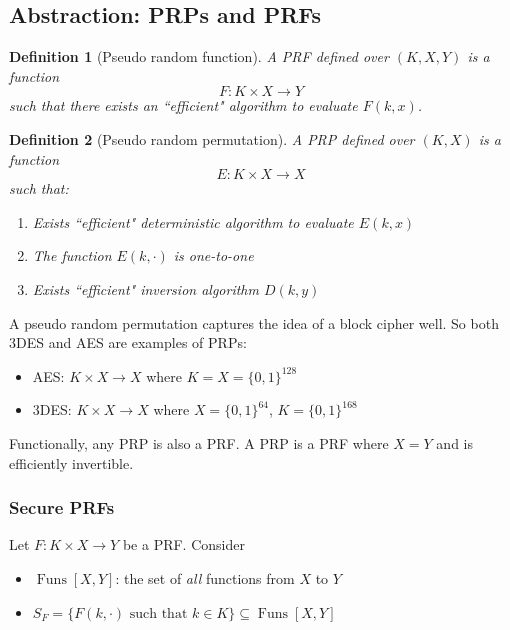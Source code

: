 \documentclass[10pt,a4paper]{report}
\newtheorem{definition}{Definition}[section]
\begin{document}
\subsection{Abstraction: PRPs and PRFs}

\begin{definition}[Pseudo random function]
    A PRF defined over $(K, X, Y)$ is a function
        $$ F\colon K \times X \to Y $$
    such that there exists an ``efficient" algorithm to evaluate $F(k, x)$.
\end{definition}

\begin{definition}[Pseudo random permutation]
    A PRP defined over $(K, X)$ is a function
        $$ E\colon K \times X \to X $$
    such that:
    \begin{enumerate}
        \item Exists ``efficient" deterministic algorithm to evaluate $E(k, x)$
        \item The function $E(k, \cdot)$ is one-to-one
        \item Exists ``efficient" inversion algorithm $D(k, y)$
    \end{enumerate}
\end{definition}

A pseudo random permutation captures the idea of a block cipher well. So both 3DES and AES are
examples of PRPs:

\begin{itemize}
    \item AES: $K \times X \to X$ where $K = X = \{0, 1\}^{128}$
    \item 3DES: $K \times X \to X$ where $X = \{0, 1\}^{64}$, $K = \{0, 1\}^{168}$
\end{itemize}

Functionally, any PRP is also a PRF. A PRP is a PRF where $X = Y$ and is efficiently invertible.

\subsubsection{Secure PRFs}

Let $F\colon K \times X \to Y$ be a PRF. Consider

\begin{itemize}
    \item $\operatorname{Funs}[X, Y]$: the set of \textit{all} functions from $X$ to $Y$
    \item $S_F = \{F(k, \cdot) \text{ such that } k \in K\} \subseteq \operatorname{Funs}[X, Y]$
\end{itemize}
\end{document}
